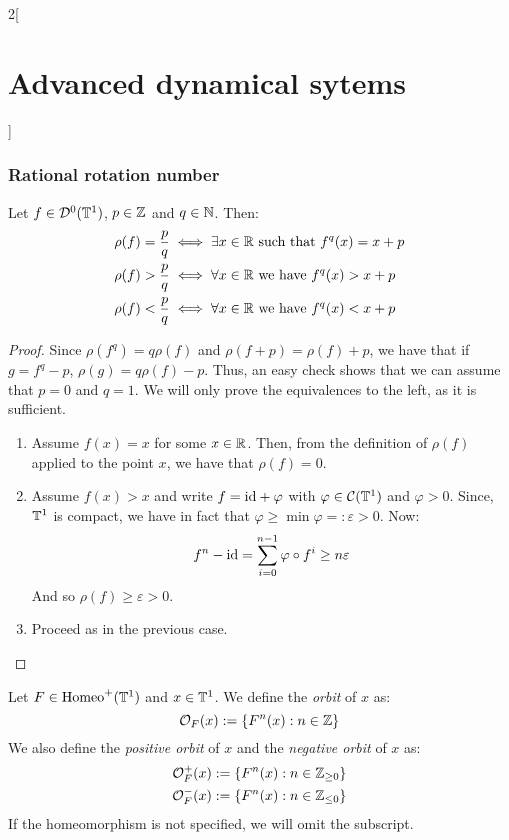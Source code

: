 \documentclass[../../../main_math.tex]{subfiles}
\begin{document}
\begin{multicols}{2}[\section{Advanced dynamical sytems}]
  \subsubsection{Rational rotation number}
  \begin{proposition}\label{ADS:characterisation_rot_number}
    Let $f\in \mathcal{D}^0(\mathbb{T}^1)$, $p\in\mathbb{Z}$ and $q\in\mathbb{N}$. Then:
    \begin{align*}
      \rho(f)=\frac{p}{q} & \iff \exists x\in\mathbb{R}\text{ such that }f^q(x)=x+p \\
      \rho(f)>\frac{p}{q} & \iff \forall x\in\mathbb{R}\text{ we have }f^q(x)>x+p   \\
      \rho(f)<\frac{p}{q} & \iff \forall x\in\mathbb{R}\text{ we have }f^q(x)<x+p
    \end{align*}
  \end{proposition}
  \begin{proof}
    Since $\rho(f^q)= q\rho(f)$ and $\rho(f+p)=\rho(f)+p$, we have that if $g=f^q-p$, $\rho(g)=q \rho(f)-p$. Thus, an easy check shows that we can assume that $p=0$ and $q=1$. We will only prove the equivalences to the left, as it is sufficient.
    \begin{enumerate}
      \item Assume $f(x)=x$ for some $x\in\mathbb{R}$. Then, from the definition of $\rho(f)$ applied to the point $x$, we have that $\rho(f)=0$.
      \item Assume $f(x)>x$ and write $f=\mathrm{id}+\varphi$ with $\varphi\in\mathcal{C}(\mathbb{T}^1)$ and $\varphi>0$. Since, $\mathbb{T}^1$ is compact, we have in fact that $\varphi\geq \min\varphi=:\varepsilon>0$. Now:
            $$
              f^n-\mathrm{id} = \sum_{i=0}^{n-1}\varphi\circ f^i\geq n\varepsilon
            $$
            And so $\rho(f)\geq \varepsilon>0$.
      \item Proceed as in the previous case.
    \end{enumerate}
  \end{proof}
  \begin{definition}
    Let $F\in\mathrm{Homeo}^+(\mathbb{T}^1)$ and $x\in \mathbb{T}^1$. We define the \emph{orbit} of $x$ as:
    $$
      \mathcal{O}_F(x):=\{F^n(x):n\in\mathbb{Z}\}
    $$
    We also define the \emph{positive orbit} of $x$  and the \emph{negative orbit} of $x$ as:
    \begin{align*}
      \mathcal{O}_F^+(x) & :=\{F^n(x):n\in\mathbb{Z}_{\geq 0}\} \\
      \mathcal{O}_F^-(x) & :=\{F^n(x):n\in\mathbb{Z}_{\leq 0}\}
    \end{align*}
    If the homeomorphism is not specified, we will omit the subscript.

\end{definition}
\end{multicols}
\end{document}
